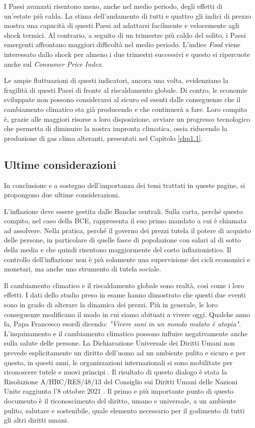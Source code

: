 I Paesi avanzati risentono meno, anche nel medio periodo, degli effetti di un'estate più calda. La stima dell'andamento di tutti e quattro gli indici di prezzo mostra una capacità di questi Paesi ad adattarsi facilmente e velocemente agli shock termici. Al contrario, a seguito di un trimestre più caldo del solito, i Paesi emergenti affrontano maggiori difficoltà nel medio periodo. L'indice \textit{Food} viene interessato dallo shock per almeno i due trimestri successivi e questo si ripercuote anche sul \textit{Consumer Price Index}.

Le ampie fluttuazioni di questi indicatori, ancora una volta, evidenziano la fragilità di questi Paesi di fronte al riscaldamento globale. Di contro, le economie sviluppate non possono considerarsi al sicuro ed esenti dalle conseguenze che il cambiamento climatico sta già producendo e che continuerà a fare. Loro compito è, grazie alle maggiori risorse a loro disposizione, avviare un progresso tecnologico che permetta di diminuire la nostra impronta climatica, ossia riducendo la produzione di gas clima alteranti, presentati nel Capitolo \ref{chp1.1}.

\subsection{Ultime considerazioni}

In conclusione e a sostegno dell'importanza dei temi trattati in queste pagine, si propongono due ultime considerazioni.

L'inflazione deve essere gestita dalle Banche centrali. Sulla carta, perché questo compito, nel caso della BCE, rappresenta il suo primo mandato a cui è chiamata ad assolvere. Nella pratica, perché il governo dei prezzi tutela il potere di acquisto delle persone, in particolare di quelle fasce di popolazione con salari al di sotto della media e che quindi risentono maggiormente del costo inflazionistico. Il controllo dell'inflazione non è più solamente una supervisione dei cicli economici e monetari, ma anche uno strumento di tutela sociale.

Il cambiamento climatico e il riscaldamento globale sono realtà, così come i loro effetti. I dati dello studio preso in esame hanno dimostrato che questi due eventi sono in grado di alterare la dinamica dei prezzi. Più in generale, le loro conseguenze modificano il modo in cui siamo abituati a vivere oggi. Qualche anno fa, Papa Francesco esordì dicendo: \textit{"Vivere sani in un mondo malato è utopia"}. L'inquinamento e il cambiamento climatico possono influire negativamente anche sulla salute delle persone. La Dichiarazione Universale dei Diritti Umani non prevede esplicitamente un diritto dell'uomo ad un ambiente pulito e sicuro e per questo, in questi anni, le organizzazioni internazionali si sono mobilitate per riconoscere tutele e nuovi principi \parencite{hrc:europe}. Il risultato di questo dialogo è stata la Risoluzione A/HRC/RES/48/13 del Consiglio sui Diritti Umani delle Nazioni Unite raggiunta l'8 ottobre 2021 \parencite{hrc:risoluzione}. Il primo e più importante punto di questo documento è il riconoscimento del diritto, umano e universale, a un ambiente pulito, salutare e sostenibile, quale elemento necessario per il godimento di tutti gli altri diritti umani.

